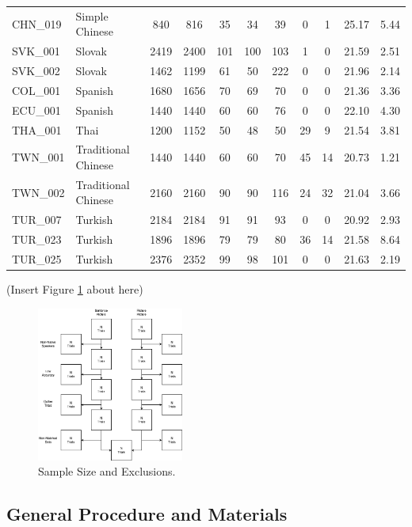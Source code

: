 \documentclass[
  man]{apa7}
\begin{document}
\begin{table}
\begin{tabular}[t]{llcccccccll}
CHN\_019 & Simple Chinese & 840 & 816 & 35 & 34 & 39 & 0 & 1 & 25.17 & 5.44\\
\addlinespace
SVK\_001 & Slovak & 2419 & 2400 & 101 & 100 & 103 & 1 & 0 & 21.59 & 2.51\\
SVK\_002 & Slovak & 1462 & 1199 & 61 & 50 & 222 & 0 & 0 & 21.96 & 2.14\\
COL\_001 & Spanish & 1680 & 1656 & 70 & 69 & 70 & 0 & 0 & 21.36 & 3.36\\
ECU\_001 & Spanish & 1440 & 1440 & 60 & 60 & 76 & 0 & 0 & 22.10 & 4.30\\
THA\_001 & Thai & 1200 & 1152 & 50 & 48 & 50 & 29 & 9 & 21.54 & 3.81\\
\addlinespace
TWN\_001 & Traditional Chinese & 1440 & 1440 & 60 & 60 & 70 & 45 & 14 & 20.73 & 1.21\\
TWN\_002 & Traditional Chinese & 2160 & 2160 & 90 & 90 & 116 & 24 & 32 & 21.04 & 3.66\\
TUR\_007 & Turkish & 2184 & 2184 & 91 & 91 & 93 & 0 & 0 & 20.92 & 2.93\\
TUR\_023 & Turkish & 1896 & 1896 & 79 & 79 & 80 & 36 & 14 & 21.58 & 8.64\\
TUR\_025 & Turkish & 2376 & 2352 & 99 & 98 & 101 & 0 & 0 & 21.63 & 2.19\\
\bottomrule
\end{tabular}
\end{table}

(Insert Figure \ref{fig:sample-fig} about here)

\begin{figure}
\includegraphics[width=1.9in]{includes/fig/psa002_flow.drawio} \caption{Sample Size and Exclusions.}\label{fig:sample-fig}
\end{figure}

\hypertarget{general-procedure-and-materials}{%
\subsection{General Procedure and Materials}\label{general-procedure-and-materials}}
\end{document}
